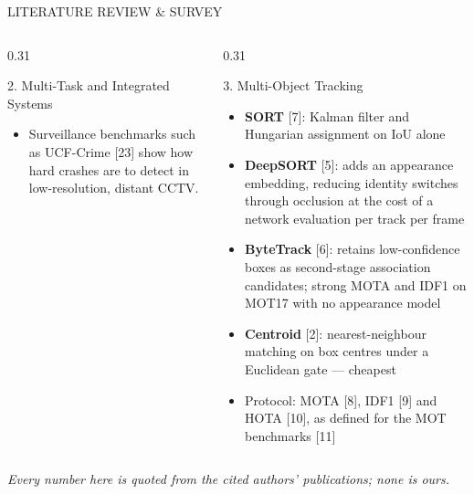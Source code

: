 \documentclass[aspectratio=169,10pt,t]{beamer}
\begin{document}
\begin{frame}{LITERATURE REVIEW \& SURVEY}
\begin{columns}[T,onlytextwidth]
\begin{column}{0.31\textwidth}
\begin{block}{2. Multi-Task and Integrated Systems}
\begin{itemize}
  \item Surveillance benchmarks such as UCF-Crime [23] show how hard crashes are to detect in low-resolution, distant CCTV.
\end{itemize}
\end{block}
\end{column}
\begin{column}{0.31\textwidth}
\begin{block}{3. Multi-Object Tracking}
\begin{itemize}\setlength{\itemsep}{0.1em}
  \item \textbf{SORT} [7]: Kalman filter and Hungarian assignment on IoU alone
  \item \textbf{DeepSORT} [5]: adds an appearance embedding, reducing identity switches through occlusion at the cost
        of a network evaluation per track per frame
  \item \textbf{ByteTrack} [6]: retains low-confidence boxes as second-stage association candidates; strong MOTA and
        IDF1 on MOT17 with no appearance model
  \item \textbf{Centroid} [2]: nearest-neighbour matching on box centres under a Euclidean gate --- cheapest
  \item Protocol: MOTA [8], IDF1 [9] and HOTA [10], as defined for the MOT benchmarks [11]
\end{itemize}
\end{block}
\end{column}
\end{columns}
\vspace{0.1em}
{\centering\tiny\itshape Every number here is quoted from the cited authors' publications; none is ours.\par}
\end{frame}
\end{document}

